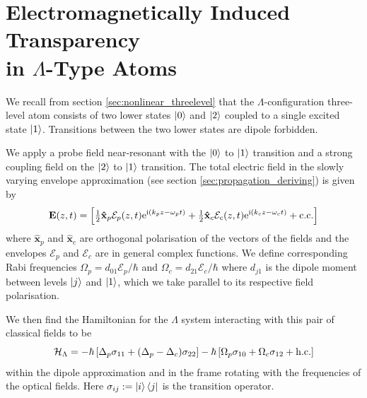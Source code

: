 \section[Electromagnetically Induced Transparency in $\Lambda$-Type Atoms]
  {Electromagnetically Induced Transparency\\ in $\Lambda$-Type Atoms}
  \label{sec:polaritons_eit}

    We recall from section \ref{sec:nonlinear_threelevel} that the
    $\Lambda$-configuration three-level atom consists of two lower states
    $\Ket{0}$ and $\Ket{2}$ coupled to a single excited state $\Ket{1}$.
    Transitions between the two lower states are dipole forbidden.

    We apply a probe field near-resonant with the $\Ket{0}$ to $\Ket{1}$
    transition and a strong coupling field on the $\Ket{2}$ to $\Ket{1}$
    transition. The total electric field in the slowly varying envelope
    approximation (see section \ref{sec:propagation_deriving}) is given by 
    \begin{equation}
      \mathbf{E}(z,t) = \left[ \tfrac{1}{2} \mathbf{\hat{x}}_p 
        \mathcal{E}_p(z,t) \mathrm{e}^{\mathrm{i}(k_p z - \omega_p t)} + 
        \tfrac{1}{2} \mathbf{\hat{x}}_c \mathcal{E}_c(z,t) \mathrm{e}^{\mathrm{i}(k_c z -
        \omega_c t)} + \mathrm{c.c.} \right]
      \label{eqn:lambda_field}
    \end{equation}
   where $\mathbf{\hat{x}}_p$ and $\mathbf{\hat{x}}_c$ are orthogonal
    polarisation of the vectors of the fields and the envelopes $\mathcal{E}_p$
    and $\mathcal{E}_c$ are in general complex functions. We define
    corresponding Rabi frequencies $\Omega_p = d_{01}\mathcal{E}_p/\hbar$ and
    $\Omega_c = d_{21}\mathcal{E}_c/\hbar$ where $d_{j1}$ is the dipole moment
    between levels $\Ket{j}$ and $\Ket{1}$, which we take parallel to its
    respective field polarisation.

    We then find the Hamiltonian for the $\Lambda$ system interacting with this
    pair of classical fields to be\cite{Fleischhauer2005}
    \begin{equation}
      \mathcal{H}_\mathrm{\Lambda} = -\hbar \left[ \Delta_p \sigma_{11} + 
        (\Delta_p - \Delta_c) \sigma_{22} \right] - \hbar \left[ \Omega_p 
        \sigma_{10} + \Omega_c \sigma_{12} + \mathrm{h.c.} \right]
      \label{eqn:lamda_hamiltonian}
    \end{equation}
    within the dipole approximation and in the frame rotating with the
    frequencies of the optical fields. Here $\sigma_{ij} := \Ket{i}\Bra{j}$ is
    the transition operator.

